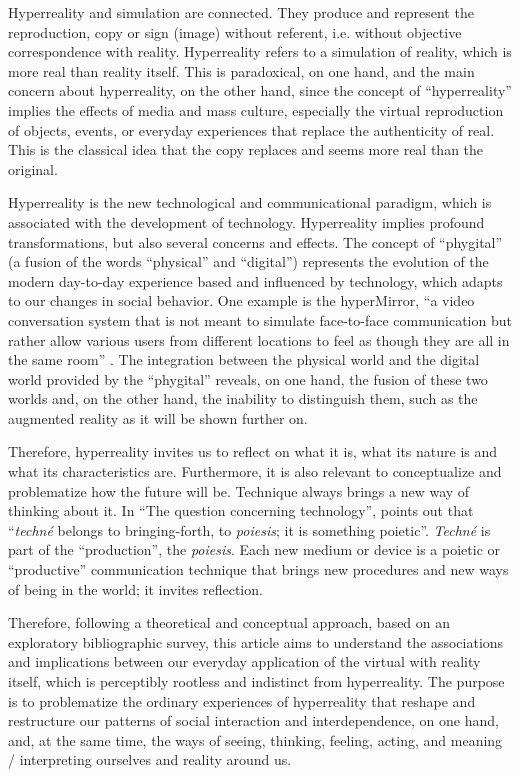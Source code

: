 \documentclass[english]{textolivre}
\begin{document}
Hyperreality and simulation are connected. They produce and represent the reproduction, copy or sign (image) without referent, i.e. without objective correspondence with reality. Hyperreality refers to a simulation of reality, which is more real than reality itself. This is paradoxical, on one hand, and the main concern about hyperreality, on the other hand, since the concept of “hyperreality” implies the effects of media and mass culture, especially the virtual reproduction of objects, events, or everyday experiences that replace the authenticity of real. This is the classical idea that the copy replaces and seems more real than the original.

Hyperreality is the new technological and communicational paradigm, which is associated with the development of technology. Hyperreality implies profound transformations, but also several concerns and effects. The concept of “phygital” (a fusion of the words “physical” and “digital”) represents the evolution of the modern day-to-day experience based and influenced by technology, which adapts to our changes in social behavior. One example is the hyperMirror, “a video conversation system that is not meant to simulate face-to-face communication but rather allow various users from different locations to feel as though they are all in the same room” \cite[p.~68]{kipper_augmented_2013}. The integration between the physical world and the digital world provided by the “phygital” reveals, on one hand, the fusion of these two worlds and, on the other hand, the inability to distinguish them, such as the augmented reality as it will be shown further on.

Therefore, hyperreality invites us to reflect on what it is, what its nature is and what its characteristics are. Furthermore, it is also relevant to conceptualize and problematize how the future will be. Technique always brings a new way of thinking about it. In “The question concerning technology”, \textcite[p.~13]{heidegger_question_1977} points out that “\textit{techné} belongs to bringing-forth, to \textit{poiesis}; it is something poietic”. \textit{Techné} is part of the “production”, the \textit{poiesis}. Each new medium or device is a poietic or “productive” communication technique that brings new procedures and new ways of being in the world; it invites reflection.

Therefore, following a theoretical and conceptual approach, based on an exploratory bibliographic survey, this article aims to understand the associations and implications between our everyday application of the virtual with reality itself, which is perceptibly rootless and indistinct from hyperreality. The purpose is to problematize the ordinary experiences of hyperreality that reshape and restructure our patterns of social interaction and interdependence, on one hand, and, at the same time, the ways of seeing, thinking, feeling, acting, and meaning / interpreting ourselves and reality around us.
\end{document}
